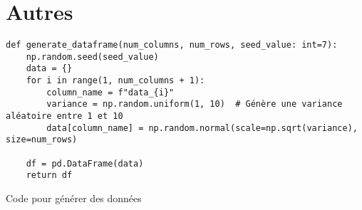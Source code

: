 \section{Autres} \label{ansec:autres}
\begin{listing} [H]
\begin{verbatim}
def generate_dataframe(num_columns, num_rows, seed_value: int=7):
    np.random.seed(seed_value)
    data = {}
    for i in range(1, num_columns + 1):
        column_name = f"data_{i}"
        variance = np.random.uniform(1, 10)  # Génère une variance aléatoire entre 1 et 10
        data[column_name] = np.random.normal(scale=np.sqrt(variance), size=num_rows)
    
    df = pd.DataFrame(data)
    return df
\end{verbatim}
\caption{Code pour générer des données}
\label{code:data_gen}
\end{listing}


